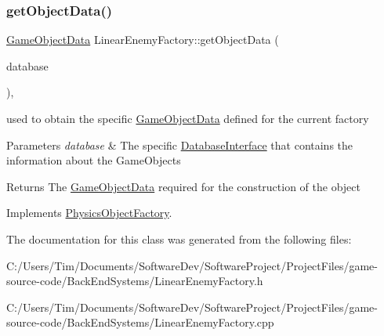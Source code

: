 \mbox{\label{class_linear_enemy_factory_a9d959b8a414e30ad4813d5d3740eafee}} 
\subsubsection{\texorpdfstring{get\+Object\+Data()}{getObjectData()}}
{\footnotesize\ttfamily \hyperlink{struct_game_object_data}{Game\+Object\+Data} Linear\+Enemy\+Factory\+::get\+Object\+Data (\begin{DoxyParamCaption}\item[{const std\+::shared\+\_\+ptr$<$ \hyperlink{class_database_interface}{Database\+Interface} $>$ \&}]{database }\end{DoxyParamCaption})\hspace{0.3cm}{\ttfamily [override]}, {\ttfamily [virtual]}}



used to obtain the specific \hyperlink{struct_game_object_data}{Game\+Object\+Data} defined for the current factory 


\begin{DoxyParams}{Parameters}
{\em database} & The specific \hyperlink{class_database_interface}{Database\+Interface} that contains the information about the Game\+Objects \\
\hline
\end{DoxyParams}
\begin{DoxyReturn}{Returns}
The \hyperlink{struct_game_object_data}{Game\+Object\+Data} required for the construction of the object 
\end{DoxyReturn}


Implements \hyperlink{class_physics_object_factory_aa59f52d3adc1fac676f4a8a3c2de9ba9}{Physics\+Object\+Factory}.



The documentation for this class was generated from the following files\+:\begin{DoxyCompactItemize}
\item 
C\+:/\+Users/\+Tim/\+Documents/\+Software\+Dev/\+Software\+Project/\+Project\+Files/game-\/source-\/code/\+Back\+End\+Systems/Linear\+Enemy\+Factory.\+h\item 
C\+:/\+Users/\+Tim/\+Documents/\+Software\+Dev/\+Software\+Project/\+Project\+Files/game-\/source-\/code/\+Back\+End\+Systems/Linear\+Enemy\+Factory.\+cpp\end{DoxyCompactItemize}
